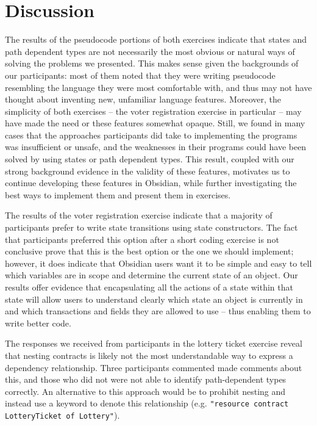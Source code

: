\documentclass[sigplan,10pt,review]{acmart}\settopmatter{printfolios=true}
\begin{document}
\section{Discussion}

The results of the pseudocode portions of both exercises indicate that states and path dependent types are not necessarily the most obvious or 
natural ways of solving the problems we presented. This makes sense given the backgrounds of our participants: most of them noted that they 
were writing pseudocode resembling the language they were most comfortable with, and thus may not have thought about inventing new, 
unfamiliar language features. Moreover, the simplicity of both exercises -- the voter registration exercise in particular -- may have made the 
need or these features somewhat opaque. Still, we found in many cases that the approaches participants did take to implementing the 
programs was insufficient or unsafe, and the weaknesses in their programs could have been solved by using states or path dependent 
types. This result, coupled with our strong background evidence in the validity of these features, motivates us to continue developing these
features in Obsidian, while further investigating the best ways to implement them and present them in exercises. 

The results of the voter registration exercise indicate that a majority of participants prefer to write state transitions using state constructors. The 
fact that participants preferred this option after a short coding exercise is not conclusive prove that this is the best option or the one we should 
implement; however, it does indicate that Obsidian users want it to be simple and easy to tell which variables are in scope and determine the 
current state of an object. Our results offer evidence that encapsulating all the actions of a state within that state will allow users to understand 
clearly which state an object is currently in and which transactions and fields they are allowed to use -- thus enabling them to write better code. 

The responses we received from participants in the lottery ticket exercise reveal that nesting contracts is likely not the most understandable
way to express a dependency relationship. Three participants commented made comments about this, and those who did not were not 
able to identify path-dependent types correctly. An alternative to this approach would be to prohibit nesting and instead use a keyword
to denote this relationship (e.g. \texttt{"resource contract LotteryTicket of Lottery"}).
\end{document}
